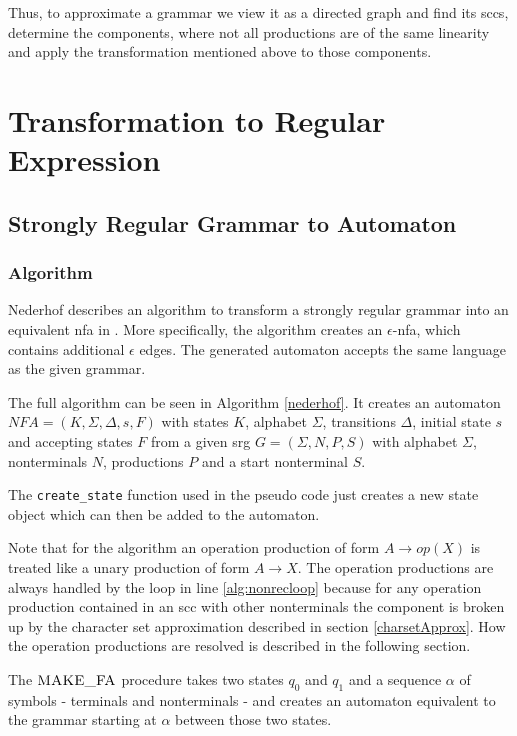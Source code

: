 Thus, to approximate a grammar we view it as a directed graph and find its \acp{scc}, determine the components, where not all productions are of the same linearity and apply the transformation mentioned above to those components.


\section{Transformation to Regular Expression}

\subsection{Strongly Regular Grammar to Automaton}

\subsubsection{Algorithm}

Nederhof describes an algorithm to transform a strongly regular grammar into an equivalent \ac{nfa} in \cite{nederhof}.
More specifically, the algorithm creates an $\epsilon$-\ac{nfa}, which contains additional $\epsilon$ edges. The generated automaton accepts the same language as the given grammar.

The full algorithm can be seen in Algorithm \ref{nederhof}. It creates an automaton $NFA = (K,\Sigma, \Delta, s, F)$ with states $K$, alphabet $\Sigma$, transitions $\Delta$, initial state $s$ and accepting states $F$ from a given \ac{srg} $G = (\Sigma, N, P, S)$ with alphabet $\Sigma$, nonterminals $N$, productions $P$ and a start nonterminal $S$.

The \texttt{create\_state} function used in the pseudo code just creates a new state object which can then be added to the automaton.

Note that for the algorithm an operation production of form $A \rightarrow op(X)$ is treated like a unary production of form $A \rightarrow X$. The operation productions are always handled by the loop in line \ref{alg:nonrecloop} because for any operation production contained in an \ac{scc} with other nonterminals the component is broken up by the character set approximation described in section \ref{charsetApprox}. 
How the operation productions are resolved is described in the following section. 

The $\textproc{MAKE\_FA}$ procedure takes two states $q_0$ and $q_1$ and a sequence $\alpha$ of symbols - terminals and nonterminals - and creates an automaton equivalent to the grammar starting at $\alpha$ between those two states.

